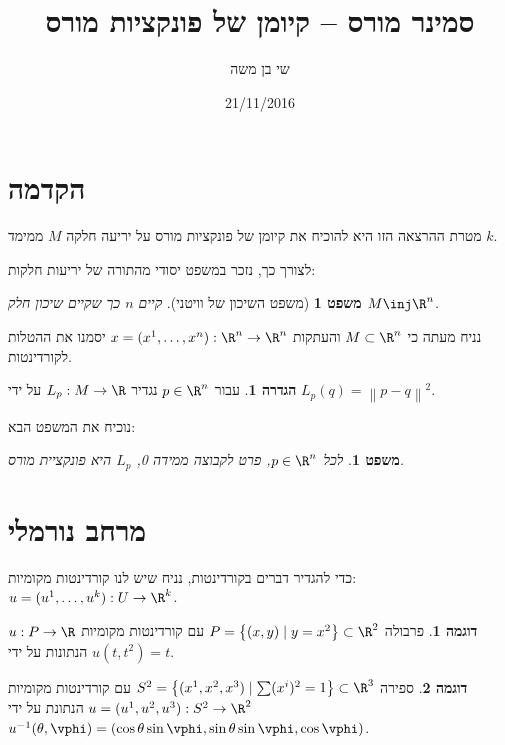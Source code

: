 \documentclass{article}
\title{סמינר מורס – קיומן של פונקציות מורס}
\author{שי בן משה}
\date{21/11/2016}
\newtheorem{theorem}{משפט}
\newtheorem*{theorem*}{משפט}
\theoremstyle{definition}
\newtheorem*{definition*}{הגדרה}
\newtheorem*{example*}{דוגמה}
\newcommand{\norm}[1]{\left\lVert#1\right\rVert}
\begin{document}
	\maketitle
	
	
	
	
	\section{הקדמה}
	
	מטרת ההרצאה הזו היא להוכיח את קיומן של פונקציות מורס על יריעה חלקה \(M\) ממימד \(k\).
	
	לצורך כך, נזכר במשפט יסודי מהתורה של יריעות חלקות:
	\begin{theorem*}[משפט השיכון של וויטני]
		קיים \(n\) כך שקיים שיכון חלק
		\(M \inj \R^n\).
	\end{theorem*}
	נניח מעתה כי 
	\(M \subset \R^n\)
	והעתקות
	\(x=(x^1,\dotsc,x^n): \R^n \to \R^n\)
	יסמנו את ההטלות לקורדינטות.
	
	\begin{definition*}
		עבור
		\(p\in \R^n\)
		נגדיר
		\(L_p:M\to \R\)
		על ידי
		\(L_p(q)=\norm{p-q}^2\).
	\end{definition*}

	נוכיח את המשפט הבא:
	\begin{theorem}
		לכל
		\(p\in \R^n\),
		פרט לקבוצה ממידה 0, \(L_p\) היא פונקציית מורס.
	\end{theorem}




	\section{מרחב נורמלי}
	
	כדי להגדיר דברים בקורדינטות, נניח שיש לנו קורדינטות מקומיות:
	\(u=(u^1,\dotsc,u^k): U \to \R^k\).
	
	\begin{example*}
		פרבולה
		\(P = \left\{(x,y) \mid y=x^2 \right\} \subset \R^2 \)
		עם קורדינטות מקומיות
		\(u: P \to \R\)
		הנתונות על ידי
		\(u(t,t^2)=t\).
	\end{example*}

	\begin{example*}
		ספירה
		\(S^2 = \left\{(x^1,x^2,x^3) \mid \sum (x^i)^2 = 1 \right\} \subset \R^3 \)
		עם קורדינטות מקומיות
		\(u=(u^1,u^2,u^3): S^2 \to \R^2\)
		הנתונת על ידי
		\(
			u^{-1}(\theta, \vphi) = \left(
				\cos\theta \sin\vphi,
				\sin\theta \sin\vphi,
				\cos\vphi
			\right)
		\).
	\end{example*}
	
\end{document}
